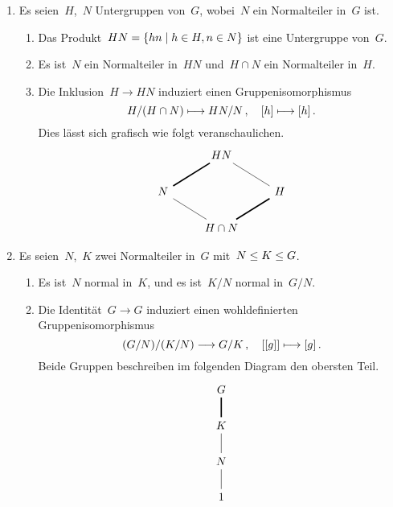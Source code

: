 \begin{corollary}
  \leavevmode
  \begin{enumerate}
    \item
      Es seien~$H$,~$N$ Untergruppen von~$G$, wobei~$N$ ein Normalteiler in~$G$ ist.
      \begin{enumerate}
        \item
          Das Produkt~$HN = \{ hn \suchthat h \in H, n \in N \}$ ist eine Untergruppe von~$G$.
        \item
          Es ist~$N$ ein Normalteiler in~$HN$ und~$H \cap N$ ein Normalteiler in~$H$.
        \item
          Die Inklusion~$H \to HN$ induziert einen Gruppenisomorphismus
          \[
            H / (H \cap N)
            \mapsto
            HN / N \,,
            \quad
            \class{h}
            \mapsto
            \class{h} \,.
          \]
          Dies lässt sich grafisch wie folgt veranschaulichen.
          \[
            \begin{tikzcd}
              {}
              &
              HN
              &
              {}
              \\
              N
              \arrow[very thick, dash]{ur}
              &
              {}
              &
              H
              \arrow[dash]{ul}
              \\
              {}
              &
              H \cap N
              \arrow[dash]{ul}
              \arrow[very thick, dash]{ur}
              &
              {}
            \end{tikzcd}
          \]
      \end{enumerate}
    \item
      Es seien~$N$,~$K$ zwei Normalteiler in~$G$ mit~$N \leq K \leq G$.
      \begin{enumerate}
        \item
          Es ist~$N$ normal in~$K$, und es ist~$K/N$ normal in~$G/N$.
        \item
          Die Identität~$G \to G$ induziert einen wohldefinierten Gruppenisomorphismus
          \[
            (G/N) / (K/N)
            \to
            G / K \,,
            \quad
            \class{ \class{g} }
            \mapsto
            \class{g} \,.
          \]
          Beide Gruppen beschreiben im folgenden Diagram den obersten Teil.
          \[
            \begin{tikzcd}
              G
              \\
              K
              \arrow[very thick, dash]{u}
              \\
              N
              \arrow[dash]{u}
              \\
              1
              \arrow[dash]{u}
            \end{tikzcd}
          \]
      \end{enumerate}
  \end{enumerate}
\end{corollary}
